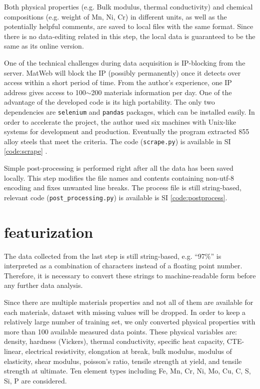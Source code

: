 \documentclass[10pt,aps,prb,amsmath,amssymb,twocolumn,letterpaper,nobalancelastpage,final,citeautoscript,floatfix,raggedbottom,superscriptaddress]{revtex4-1}
\begin{document}
Both physical properties (e.g. Bulk modulus, thermal conductivity) and chemical compositions (e.g. weight of Mn, Ni, Cr) in different units, as well as the potentially helpful comments, are saved to local files with the same format. Since there is no data-editing related in this step, the local data is guaranteed to be the same as its online version.

One of the technical challenges during data acquisition is IP-blocking from the server. MatWeb will block the IP (possibly permanently) once it detects over access within a short period of time. From the author's experience, one IP address gives access to 100$\sim$200 materials information per day. One of the advantage of the developed code is its high portability. The only two dependencies are \texttt{selenium} and \texttt{pandas} packages, which can be installed easily. In order to accelerate the project, the author used six machines with Unix-like systems for development and production. Eventually the program extracted 855 alloy steels that meet the criteria. The code (\texttt{scrape.py}) is available in SI \ref{code:scrape} .

Simple post-processing is performed right after all the data has been saved locally. This step modifies the file names and contents containing non-utf-8 encoding and fixes unwanted line breaks. The process file is still string-based, relevant code (\texttt{post\_processing.py}) is available is SI \ref{code:postprocess}.

\section{featurization}

The data collected from the last step is still string-based, e.g. ``97\%'' is interpreted as a combination of characters instead of a floating point number. Therefore, it is necessary to convert these strings to machine-readable form before any further data analysis.

Since there are multiple materials properties and not all of them are available for each materials, dataset with missing values will be dropped. In order to keep a relatively large number of training set, we only converted physical properties with more than 100 available measured data points. These physical variables are: density, hardness (Vickers), thermal conductivity, specific heat capacity, CTE-linear, electrical resistivity, elongation at break, bulk modulus, modulus of elasticity, shear modulus, poisson's ratio, tensile strength at yield, and tensile strength at ultimate. Ten element types including Fe, Mn, Cr, Ni, Mo, Cu, C, S, Si, P are considered.
\end{document}
